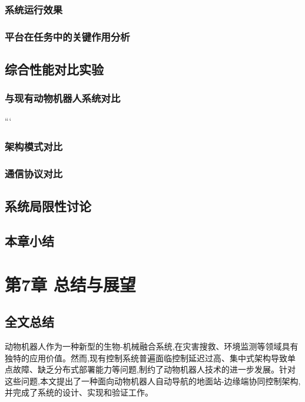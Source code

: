 \subsection{系统运行效果}


\subsection{平台在任务中的关键作用分析}



\section{综合性能对比实验}
\subsection{与现有动物机器人系统对比}

```

\subsection{架构模式对比}


\subsection{通信协议对比}

\section{系统局限性讨论}

\section{本章小结}




\chapter{第7章 总结与展望}
\section{全文总结}
动物机器人作为一种新型的生物-机械融合系统,在灾害搜救、环境监测等领域具有独特的应用价值。然而,现有控制系统普遍面临控制延迟过高、集中式架构导致单点故障、缺乏分布式部署能力等问题,制约了动物机器人技术的进一步发展。针对这些问题,本文提出了一种面向动物机器人自动导航的地面站-边缘端协同控制架构,并完成了系统的设计、实现和验证工作。

